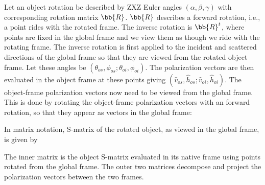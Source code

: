 %

Let an object rotation be described by ZXZ Euler angles $(\alpha,\beta,\gamma)$ with corresponding rotation matrix $\bb{R}$.  $\bb{R}$ describes a forward rotation, i.e., a point rides with the rotated frame. The inverse rotation is $\bb{R}^t$, where points are fixed in the global frame and we view them as though we ride with the rotating frame. The inverse rotation is first applied to the incident and scattered directions of the global frame so that they are viewed from the rotated object frame. Let these angles be $(\theta_{os},\phi_{os};\theta_{oi},\phi_{oi})$. The polarization vectors are then evaluated in the object frame at these points giving $(\hat{v}_{os},\hat{h}_{os};\hat{v}_{oi},\hat{h}_{oi})$. The object-frame polarization vectors now need to be viewed from the global frame. This is done by rotating the object-frame polarization vectors with an forward rotation, so that they appear as vectors in the global frame:

In matrix notation, S-matrix of the rotated object, as viewed in the global frame, is given by 
 
The inner matrix is the object S-matrix evaluated in its native frame using points rotated from the global frame. The outer two matrices decompose and project the polarization vectors between the two frames. 


